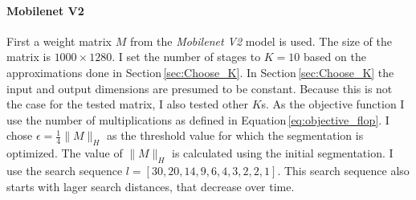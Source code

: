 \documentclass[doctype=mastersthesis,BCOR=15mm,biblatex]{ldvbook}%
\begin{document}
\paragraph{Mobilenet V2}
First a weight matrix $M$ from the \emph{Mobilenet V2} model is used.
The size of the matrix is ${1000 \times 1280}$.
I set the number of stages to $K = 10$ based on the approximations done in Section\,\ref{sec:Choose_K}.
In Section\,\ref{sec:Choose_K} the input and output dimensions are presumed to be constant.
Because this is not the case for the tested matrix, I also tested other $K$s.
As the objective function I use the number of multiplications as defined in Equation\,\ref{eq:objective_flop}.
I chose $\epsilon = \frac{1}{4} \|M\|_H$ as the threshold value for which the segmentation is optimized.
The value of $\|M\|_H$ is calculated using the initial segmentation.
I use the search sequence $l = [30, 20, 14,  9,  6,  4,  3,  2,  2,  1]$.
This search sequence also starts with lager search distances, that decrease over time.
\end{document}
